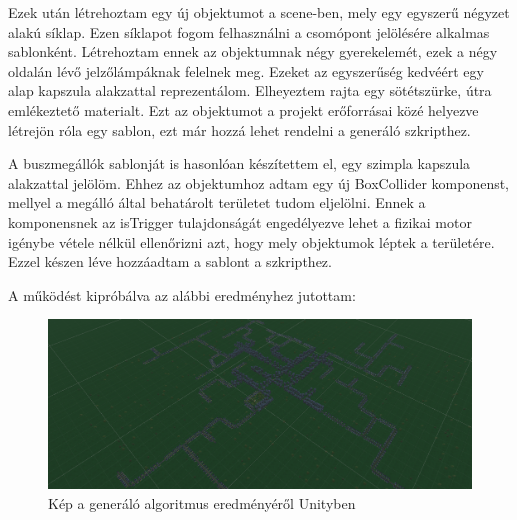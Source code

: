 Ezek után létrehoztam egy új objektumot a scene-ben, mely egy egyszerű négyzet alakú síklap. Ezen síklapot fogom felhasználni a csomópont jelölésére alkalmas sablonként. Létrehoztam ennek az objektumnak négy gyerekelemét, ezek a négy oldalán lévő jelzőlámpáknak felelnek meg. Ezeket az egyszerűség kedvéért egy alap kapszula alakzattal reprezentálom. Elheyeztem rajta egy sötétszürke, útra emlékeztető materialt. Ezt az objektumot a projekt erőforrásai közé helyezve létrejön róla egy sablon, ezt már hozzá lehet rendelni a generáló szkripthez.

A buszmegállók sablonját is hasonlóan készítettem el, egy szimpla kapszula alakzattal jelölöm. Ehhez az objektumhoz adtam egy új BoxCollider komponenst, mellyel a megálló által behatárolt területet tudom eljelölni. Ennek a komponensnek az isTrigger tulajdonságát engedélyezve lehet a fizikai motor igénybe vétele nélkül ellenőrizni azt, hogy mely objektumok léptek a területére. Ezzel készen léve hozzáadtam a sablont a szkripthez.

A működést kipróbálva az alábbi eredményhez jutottam:
\begin{figure}[H]
\includegraphics[width=\linewidth]{unitygraph.png}
\caption{Kép a generáló algoritmus eredményéről Unityben}
\label{fig:ugraph}
\end{figure}
